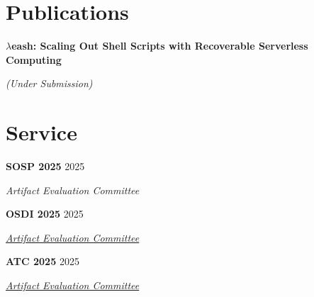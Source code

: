 \documentclass[margin,12pt]{resume}
\newcommand{\cvName}{Nikos Pagonas}
\newcommand{\subsectionVSpace}{\vspace{3.5ex}\xspace}
\newcommand{\sectionVSpace}{\vspace{1ex}\xspace} %
\newcommand{\sectionVSpaceCorrection}{\vspace{-3.5ex}} %
\newcommand{\header}[1]{\textbf{#1}\xspace}
\newcommand{\authors}[1]{#1\xspace}
\newcommand{\equalContributionNote}{(*equal contribution)\xspace}
\newcommand{\me}{\textbf{\cvName}\xspace}
\newcommand{\ordinal}[1]{\textsuperscript{#1}\xspace}
\newcommand{\paperTitle}[1]{\header{#1}\xspace}
\newcommand{\role}[1]{\textit{#1}\xspace}
\newcommand{\service}[1]{\header{#1}\xspace}
\newcommand{\underSubmission}{\textit{(Under Submission)}\xspace}
\newcommand{\venue}[1]{\textit{#1}\xspace}
\newenvironment{rSubsection}{}{\par\subsectionVSpace}
\newenvironment{rSection}[1]{\sectionVSpaceCorrection\section{#1}\xspace}{\sectionVSpace\par}
\begin{document}
\begin{resume}
\begin{rSection}{Publications}
\begin{rSubsection}
        \end{rSubsection}

        \begin{rSubsection}
            \paperTitle{\( \lambda \)eash: Scaling Out Shell Scripts with Recoverable Serverless Computing}

            \underSubmission


        \end{rSubsection}




    \end{rSection}

    \begin{rSection}{Service}
        \begin{rSubsection}
            \service{SOSP 2025} \hfill 2025

            \role{Artifact Evaluation Committee}
        \end{rSubsection}

        \begin{rSubsection}
            \service{OSDI 2025} \hfill 2025

            \role{\href{https://www.usenix.org/conference/atc25}{Artifact Evaluation Committee}}
        \end{rSubsection}

        \begin{rSubsection}
            \service{ATC 2025} \hfill 2025

            \role{\href{https://www.usenix.org/conference/osdi25}{Artifact Evaluation Committee}}
        \end{rSubsection}


\end{rSection}
\end{resume}
\end{document}
